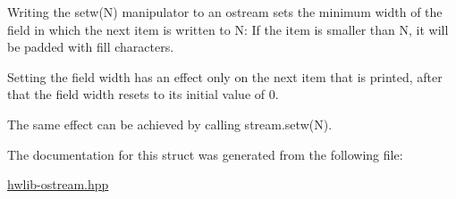 Writing the setw(\+N) manipulator to an ostream sets the minimum width of the field in which the next item is written to N\+: If the item is smaller than N, it will be padded with fill characters.

Setting the field width has an effect only on the next item that is printed, after that the field width resets to its initial value of 0.

The same effect can be achieved by calling stream.\+setw(\+N). 

The documentation for this struct was generated from the following file\+:\begin{DoxyCompactItemize}
\item 
\hyperlink{hwlib-ostream_8hpp}{hwlib-\/ostream.\+hpp}\end{DoxyCompactItemize}

